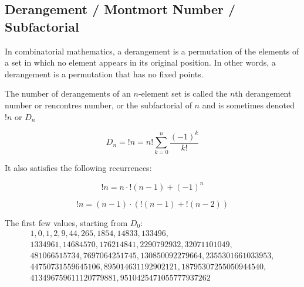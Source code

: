 \subsection{Derangement / Montmort Number / Subfactorial}

In combinatorial mathematics, a derangement is a permutation of the elements of a set in which no element appears in its original position. In other words, a derangement is a permutation that has no fixed points.

The number of derangements of an $n$-element set is called the $n$th derangement number or rencontres number, or the subfactorial of $n$ and is sometimes denoted $!n$ or $D_n$

\begin{equation}
        D_n = !n = n! \sum_{k=0}^{n} \frac{(-1)^k}{k!}
\end{equation}

It also satisfies the following recurrences:

\begin{equation}
        !n = n \cdot !(n - 1) + (-1)^n
\end{equation}

\begin{equation}
        !n = (n - 1)\cdot (!(n - 1) + !(n - 2))
\end{equation}

The first few values, starting from $D_0$: 
\begin{equation}
        \begin{array}{l}
                1, 0, 1, 2, 9, 44, 265, 1854, 14833, 133496, \\
                1334961, 14684570, 176214841, 2290792932, 32071101049,\\
                481066515734, 7697064251745, 130850092279664, 2355301661033953, \\
                44750731559645106, 895014631192902121, 18795307255050944540, \\
                413496759611120779881, 9510425471055777937262
        \end{array}
\end{equation}
